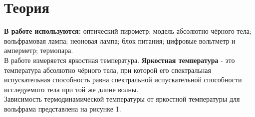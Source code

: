 

\newcommand{\formula}[2]
{
    \begin{equation}\label{#1}
        #2
    \end{equation}
}

\newcommand{\mth}[1]
{
    \begin{math}
        #1
    \end{math}
}

\newcommand{\ruB}[1]
{
    _{\text{#1}}
}

\setcounter{PicsCounter}{1}

\newcommand{\pic}[3]{
    \begin{center}
        \begin{minipage}[h!]{#1}
            \begin{center}

                \texttt{[image: \#2]}
                \textit{Рис \arabic{PicsCounter}. #3}

            \end{center}
        \end{minipage}
    \end{center}

    \stepcounter{PicsCounter}
}

\setcounter{TablesCounter}{1}

\newcommand{\tableLable}[1]{
    \textit{Таблица \arabic{TablesCounter}: #1}

    \stepcounter{TablesCounter}
}

\section{Теория}

\textbf{В работе используются:} оптический пирометр; модель абсолютно чёрного тела; вольфрамовая
лампа; неоновая лампа; блок питания; цифровые вольтметр и амперметр; термопара. \\

В работе измеряется яркостная температура. \textbf{Яркостная температура} - это
температура абсолютно чёрного тела, при которой его спектральная испускательная
способность равна спектральной испускательной способности исследуемого тела при той же
длине волны. \\

Зависимость термодинамической температуры от яркостной температуры для вольфрама
представлена на рисунке 1.

